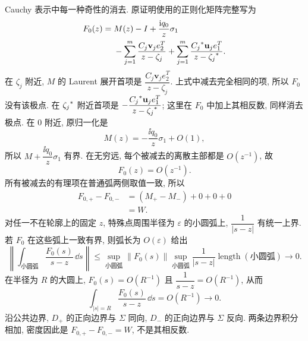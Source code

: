 \par\smallskip\noindent Cauchy 表示中每一种奇性的消去.\quad
原证明使用的正则化矩阵完整写为
\begin{equation*}
\begin{aligned}
F_0(z)
={}&M(z)-I+\dfrac{\mathrm{i} q_0}{z}\sigma_1\\
&-\sum\limits_{j=1}^{m}
\dfrac{C_j\mathbf v_je_2^T}{z-\zeta_j}
+\sum\limits_{j=1}^{m}
\dfrac{{C_j}^{*}\mathbf u_je_1^T}{z-{\zeta_j}^{*}}.
\end{aligned}
\end{equation*}
在 $\zeta_j$ 附近, $M$ 的 Laurent 展开首项是
$\dfrac{C_j\mathbf v_je_2^T}{z-\zeta_j}$.
上式中减去完全相同的项, 所以 $F_0$ 没有该极点.
在 ${\zeta_j}^{*}$ 附近首项是
$-\dfrac{{C_j}^{*}\mathbf u_je_1^T}{z-{\zeta_j}^{*}}$;
这里在 $F_0$ 中加上其相反数, 同样消去极点.
在 $0$ 附近, 原归一化是
\begin{equation*}
M(z)=-\dfrac{\ii q_0}{z}\sigma_1+O(1),
\end{equation*}
所以 $M+\dfrac{\ii q_0}{z}\sigma_1$ 有界.
在无穷远, 每个被减去的离散主部都是 $O(z^{-1})$, 故
\begin{equation*}
F_0(z)=O(z^{-1}).
\end{equation*}
所有被减去的有理项在普通弧两侧取值一致, 所以
\begin{equation*}
\begin{aligned}
F_{0,+}-F_{0,-}
&=(M_+-M_-)+0+0+0\\
&=W.
\end{aligned}
\end{equation*}
对任一不在轮廓上的固定 $z$, 特殊点周围半径为 $\varepsilon$ 的小圆弧上,
$\dfrac{1}{|s-z|}$ 有统一上界.
若 $F_0$ 在这些弧上一致有界, 则弧长为 $O(\varepsilon)$ 给出
\begin{equation*}
\left\|
\int_{\text{小圆弧}}
\dfrac{F_0(s)}{s-z}\,\dd s
\right\|
\le
\sup\limits_{\text{小圆弧}}\|F_0(s)\|
\sup\limits_{\text{小圆弧}}\dfrac{1}{|s-z|}
\operatorname{length}(\text{小圆弧})
\longrightarrow0.
\end{equation*}
在半径为 $R$ 的大圆上, $F_0(s)=O(R^{-1})$ 且
$\dfrac{1}{s-z}=O(R^{-1})$, 从而
\begin{equation*}
\int_{|s|=R}\dfrac{F_0(s)}{s-z}\,\dd s=O(R^{-1})\longrightarrow0.
\end{equation*}
沿公共边界, $D_+$ 的正向边界与 $\Sigma$ 同向,
$D_-$ 的正向边界与 $\Sigma$ 反向.
两条边界积分相加, 密度因此是 $F_{0,+}-F_{0,-}=W$, 不是其相反数.

